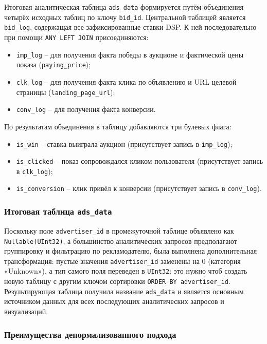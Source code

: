 Итоговая аналитическая таблица \texttt{ads\_data} формируется путём объединения четырёх исходных таблиц по ключу \texttt{bid\_id}. Центральной таблицей является \texttt{bid\_log}, содержащая все зафиксированные ставки DSP. К ней последовательно при помощи \texttt{ANY LEFT JOIN} присоединяются:

\begin{itemize}
    \item \texttt{imp\_log} -- для получения факта победы в аукционе и фактической цены показа (\texttt{paying\_price});
    \item \texttt{clk\_log} -- для получения факта клика по объявлению и URL целевой страницы (\texttt{landing\_page\_url});
    \item \texttt{conv\_log} -- для получения факта конверсии.
\end{itemize}

По результатам объединения в таблицу добавляются три булевых флага:

\begin{itemize}
    \item \texttt{is\_win} -- ставка выиграла аукцион (присутствует запись в \texttt{imp\_log});
    \item \texttt{is\_clicked} -- показ сопровождался кликом пользователя (присутствует запись в \texttt{clk\_log});
    \item \texttt{is\_conversion} -- клик привёл к конверсии (присутствует запись в \texttt{conv\_log}).
\end{itemize}

\subsubsection*{Итоговая таблица \texttt{ads\_data}}

Поскольку поле \texttt{advertiser\_id} в промежуточной таблице объявлено как \texttt{Nullable(UInt32)}, а большинство аналитических запросов предполагают группировку и фильтрацию по рекламодателю, была выполнена дополнительная трансформация: пустые значения \texttt{advertiser\_id} заменены на 0 (категория «Unknown»), а тип самого поля переведен в \texttt{UInt32}: это нужно чтоб создать новую таблицу с другим ключом сортировки \texttt{ORDER BY advertiser\_id}. Результирующая таблица получила название \texttt{ads\_data} и является основным источником данных для всех последующих аналитических запросов и визуализаций.

\subsubsection*{Преимущества денормализованного подхода}


